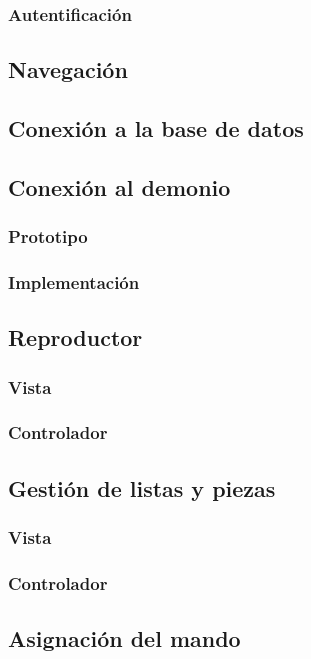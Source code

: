 \subsubsection{Autentificación}

\subsection{Navegación}

\subsection{Conexión a la base de datos}

\subsection{Conexión al demonio}
\subsubsection{Prototipo}
\subsubsection{Implementación}

\subsection{Reproductor}
\subsubsection{Vista}
\subsubsection{Controlador}

\subsection{Gestión de listas y piezas}
\subsubsection{Vista}
\subsubsection{Controlador}

\subsection{Asignación del mando}
